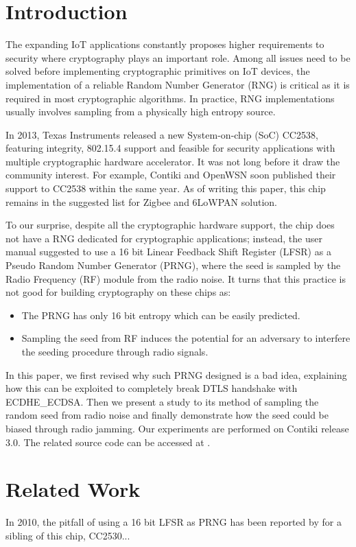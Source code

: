 \section{Introduction}
The expanding IoT applications constantly proposes higher requirements to security where cryptography plays an important role. Among all issues need to be solved before implementing cryptographic primitives on IoT devices, the implementation of a reliable Random Number Generator (RNG) is critical as it is required in most cryptographic algorithms. In practice, RNG implementations usually involves sampling from a physically high entropy source.

In 2013, Texas Instruments released a new System-on-chip (SoC)  CC2538\cite{CC2538}, featuring integrity, 802.15.4 support and feasible for security applications with multiple cryptographic hardware accelerator. It was not long before it draw the community interest. For example, Contiki and OpenWSN soon published their support to CC2538 within the same year. As of writing this paper, this chip remains in the suggested list for Zigbee and 6LoWPAN solution.

To our surprise, despite all the cryptographic hardware support, the chip does not have a RNG dedicated for cryptographic applications; instead, the user manual suggested to use a 16 bit Linear Feedback Shift Register (LFSR) as a Pseudo Random Number Generator (PRNG), where the seed is sampled by the Radio Frequency (RF) module from the radio noise. It turns that this practice is not good for building cryptography on these chips as:
\begin{itemize}
	\item The PRNG has only 16 bit entropy which can be easily predicted.
	\item Sampling the seed from RF induces the potential for an adversary to interfere the seeding procedure through radio signals.
\end{itemize}

In this paper, we first revised why such PRNG designed is a bad idea, explaining how this can be exploited to completely break DTLS handshake with ECDHE\_ECDSA. Then we present a study to its method of sampling the random seed from radio noise and finally demonstrate how the seed could be biased through radio jamming. Our experiments are performed on Contiki release 3.0. The related source code can be accessed at \cite{prngtest}.

\section{Related Work}
In 2010, the pitfall of using a 16 bit LFSR as PRNG has been reported by \cite{SmartMeterBlog}\cite{CC2530PRNG} for a sibling of this chip, CC2530...

